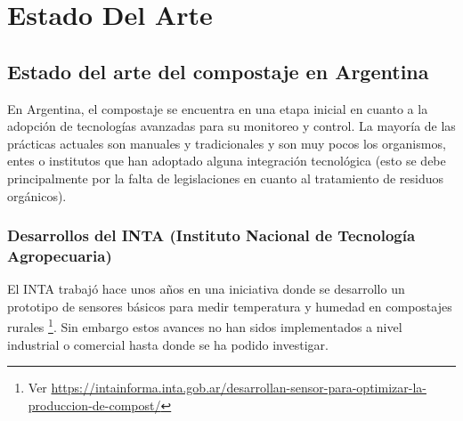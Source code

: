 \chapter{Estado Del Arte} %

\label{Chapter2} %
\label{EstadoArte}




\section{Estado del arte del compostaje en Argentina}
\label{sec:EstadoArteArgentina}

En Argentina, el compostaje se encuentra en una etapa inicial en cuanto a la adopción de tecnologías avanzadas para su monitoreo y control. La mayoría de las prácticas actuales son manuales y tradicionales y son muy pocos los organismos, entes o institutos que han adoptado alguna integración tecnológica (esto se debe principalmente por la falta de legislaciones en cuanto al tratamiento de residuos orgánicos).

\subsection{Desarrollos del INTA (Instituto Nacional de Tecnología Agropecuaria)}

El INTA trabajó hace unos años en una iniciativa donde se desarrollo un prototipo de sensores básicos para medir temperatura y humedad en compostajes rurales \footnote{Ver \url{https://intainforma.inta.gob.ar/desarrollan-sensor-para-optimizar-la-produccion-de-compost/}}. Sin embargo estos avances no han sidos implementados a nivel industrial o comercial hasta donde se ha podido investigar.

